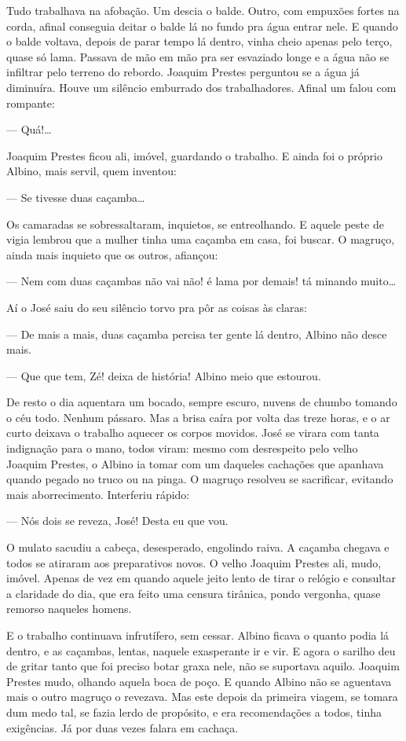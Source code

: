 \begin{linenumbers}
Tudo trabalhava na afobação. Um descia o balde. Outro, com empuxões
fortes na corda, afinal conseguia deitar o balde lá no fundo pra água
entrar nele. E quando o balde voltava, depois de parar tempo lá dentro,
vinha cheio apenas pelo terço, quase só lama. Passava de mão em mão pra
ser esvaziado longe e a água não se infiltrar pelo terreno do rebordo.
Joaquim Prestes perguntou se a água já diminuíra. Houve um silêncio
emburrado dos trabalhadores. Afinal um falou com rompante:

--- Quá!\ldots{}

Joaquim Prestes ficou ali, imóvel, guardando o trabalho. E ainda foi o
próprio Albino, mais servil, quem inventou:

--- Se tivesse duas caçamba\ldots{}

Os camaradas se sobressaltaram, inquietos, se entreolhando. E aquele
peste de vigia lembrou que a mulher tinha uma caçamba em casa, foi
buscar. O magruço, ainda mais inquieto que os outros, afiançou:

--- Nem com duas caçambas não vai não! é lama por demais! tá minando
muito\ldots{}

Aí o José saiu do seu silêncio torvo pra pôr as coisas às claras:

--- De mais a mais, duas caçamba percisa ter gente lá dentro, Albino não
desce mais.

--- Que que tem, Zé! deixa de história! Albino meio que estourou.

De resto o dia aquentara um bocado, sempre escuro, nuvens de chumbo
tomando o céu todo. Nenhum pássaro. Mas a brisa caíra por volta das
treze horas, e o ar curto deixava o trabalho aquecer os corpos movidos.
José se virara com tanta indignação para o mano, todos viram: mesmo com
desrespeito pelo velho Joaquim Prestes, o Albino ia tomar com um
daqueles cachações que apanhava quando pegado no truco ou na pinga. O
magruço resolveu se sacrificar, evitando mais aborrecimento. Interferiu
rápido:

--- Nós dois se reveza, José! Desta eu que vou.

O mulato sacudiu a cabeça, desesperado, engolindo raiva. A caçamba
chegava e todos se atiraram aos preparativos novos. O velho Joaquim
Prestes ali, mudo, imóvel. Apenas de vez em quando aquele jeito lento de
tirar o relógio e consultar a claridade do dia, que era feito uma
censura tirânica, pondo vergonha, quase remorso naqueles homens.

E o trabalho continuava infrutífero, sem cessar. Albino ficava o quanto
podia lá dentro, e as caçambas, lentas, naquele exasperante ir e vir. E
agora o sarilho deu de gritar tanto que foi preciso botar graxa nele,
não se suportava aquilo. Joaquim Prestes mudo, olhando aquela boca de
poço. E quando Albino não se aguentava mais o outro magruço o revezava.
Mas este depois da primeira viagem, se tomara dum medo tal, se fazia
lerdo de propósito, e era recomendações a todos, tinha exigências. Já
por duas vezes falara em cachaça.


\end{linenumbers}
